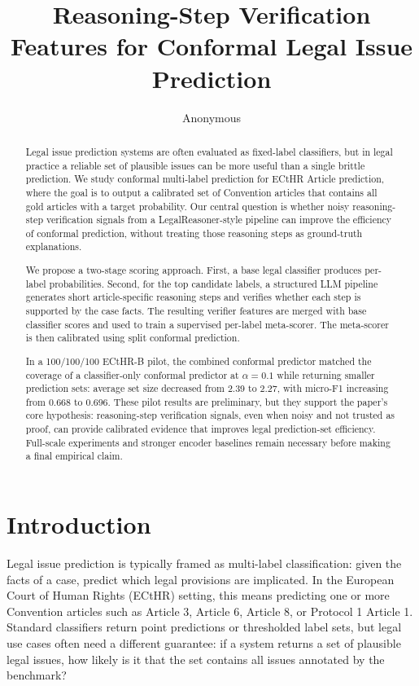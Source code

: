 \documentclass[11pt]{article}
\title{Reasoning-Step Verification Features for Conformal Legal Issue Prediction}
\author{Anonymous}
\date{}
\begin{document}
\maketitle

\begin{abstract}
Legal issue prediction systems are often evaluated as fixed-label classifiers, but in legal practice a reliable set of plausible issues can be more useful than a single brittle prediction. We study conformal multi-label prediction for ECtHR Article prediction, where the goal is to output a calibrated set of Convention articles that contains all gold articles with a target probability. Our central question is whether noisy reasoning-step verification signals from a LegalReasoner-style pipeline can improve the efficiency of conformal prediction, without treating those reasoning steps as ground-truth explanations.

We propose a two-stage scoring approach. First, a base legal classifier produces per-label probabilities. Second, for the top candidate labels, a structured LLM pipeline generates short article-specific reasoning steps and verifies whether each step is supported by the case facts. The resulting verifier features are merged with base classifier scores and used to train a supervised per-label meta-scorer. The meta-scorer is then calibrated using split conformal prediction.

In a 100/100/100 ECtHR-B pilot, the combined conformal predictor matched the coverage of a classifier-only conformal predictor at $\alpha=0.1$ while returning smaller prediction sets: average set size decreased from 2.39 to 2.27, with micro-F1 increasing from 0.668 to 0.696. These pilot results are preliminary, but they support the paper's core hypothesis: reasoning-step verification signals, even when noisy and not trusted as proof, can provide calibrated evidence that improves legal prediction-set efficiency. Full-scale experiments and stronger encoder baselines remain necessary before making a final empirical claim.
\end{abstract}

\section{Introduction}

Legal issue prediction is typically framed as multi-label classification: given the facts of a case, predict which legal provisions are implicated. In the European Court of Human Rights (ECtHR) setting, this means predicting one or more Convention articles such as Article 3, Article 6, Article 8, or Protocol 1 Article 1. Standard classifiers return point predictions or thresholded label sets, but legal use cases often need a different guarantee: if a system returns a set of plausible legal issues, how likely is it that the set contains all issues annotated by the benchmark?
\end{document}
